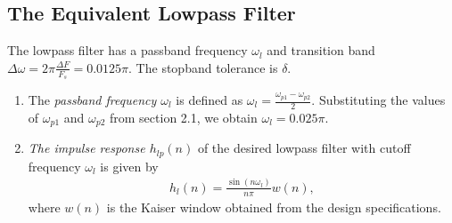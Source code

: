 \documentclass[journal,12pt,twocolumn]{IEEEtran}
\begin{document}
\subsection{The Equivalent Lowpass Filter}
The lowpass filter has a passband frequency $\omega_l$ and transition band $\Delta \omega = 2\pi \frac{\Delta F}{F_s} = 0.0125\pi$.
The stopband tolerance is $\delta$.
\begin{enumerate}
\item  The {\em passband frequency $\omega_l$}  is defined as $\omega_l = \frac{\omega_{p1} - \omega_{p2}}{2}$.  Substituting the values of $\omega_{p1}$ and $\omega_{p2}$ from section 2.1, we obtain $\omega_l = 0.025\pi$.
\item {\em The impulse response $h_{lp}(n)$} of the desired lowpass filter with cutoff frequency $\omega_l$
is given by
\begin{eqnarray}
\label{firlpdef}
h_l(n) = \frac{\sin(n\omega_l)}{n\pi}w(n),
\end{eqnarray}
where $w(n)$ is the Kaiser window obtained from the design specifications.
\end{enumerate}
\end{document}
